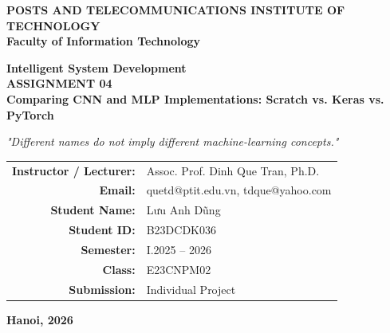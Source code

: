 \documentclass[11pt]{article}
\begin{document}
\begin{titlepage}
\begin{center}

\vspace*{0.5cm}

\Large
\textbf{POSTS AND TELECOMMUNICATIONS INSTITUTE OF TECHNOLOGY}\\
\textbf{Faculty of Information Technology}

\vspace{2.0cm}

\Huge
\textbf{Intelligent System Development}\\
\vspace{0.4cm}
\LARGE
\textbf{ASSIGNMENT 04}\\
\vspace{0.6cm}
\Large
\textbf{Comparing CNN and MLP Implementations: Scratch vs. Keras vs. PyTorch}

\vspace{1.2cm}

\large
\textit{"Different names do not imply different machine-learning concepts."}

\vfill

\normalsize
\begin{tabular}{rl}
\textbf{Instructor / Lecturer:} & Assoc. Prof. Dinh Que Tran, Ph.D. \\
\textbf{Email:} & quetd@ptit.edu.vn, tdque@yahoo.com \\[0.8cm]
\textbf{Student Name:} & Lưu Anh Dũng \\
\textbf{Student ID:} & B23DCDK036 \\
\textbf{Semester:} & I.2025 -- 2026 \\
\textbf{Class:} & E23CNPM02 \\
\textbf{Submission:} & Individual Project \\
\end{tabular}

\vfill

\textbf{Hanoi, 2026}

\vspace{0.5cm}

\end{center}
\end{titlepage}

\tableofcontents
\newpage
\end{document}
